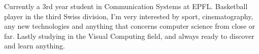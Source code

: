 

\begin{cvparagraph}

Currently a 3rd year student in Communication Systems at EPFL. Basketball player in the third Swiss division, I'm very interested by sport, cinematography, any new technologies and anything that concerns computer science from close or far. Lastly studying in the Visual Computing field, and always ready to discover and learn anything.
\end{cvparagraph}
